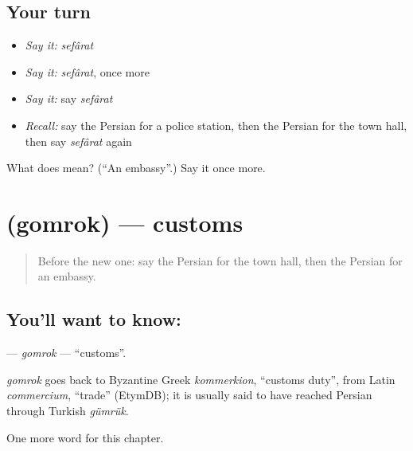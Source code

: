 \subsection*{Your turn}
\begin{itemize}
\raggedright
  \item \emph{Say it:} \emph{sefârat}
  \item \emph{Say it:} \emph{sefârat}, once more
  \item \emph{Say it:} say \emph{sefârat}
  \item \emph{Recall:} say the Persian for a police station, then the Persian for the town hall, then say \emph{sefârat} again
\end{itemize}

\begin{tcolorbox}[breakable,colback=teal!4,colframe=teal!35!black,title={Before you move on}]
What does  mean? (\textquotedblleft{}An embassy\textquotedblright{}.) Say it once more.
\end{tcolorbox}
\section[\texorpdfstring{\fa{گمرک} (gomrok)}{گمرک (gomrok)}]{ (gomrok) — customs}

\label{lesson:FA-C155-gomrok}



\begin{quote}
Before the new one: say the Persian for the town hall, then the Persian for an embassy.
\end{quote}

\subsection*{You'll want to know: }
\textbf{} — \emph{gomrok} — \textquotedblleft{}customs\textquotedblright{}.

\begin{cousinweb}
\emph{gomrok} goes back to Byzantine Greek \emph{kommerkion}, \textquotedblleft{}customs duty\textquotedblright{}, from Latin \emph{commercium}, \textquotedblleft{}trade\textquotedblright{} (EtymDB); it is usually said to have reached Persian through Turkish \emph{gümrük}.
\end{cousinweb}

\begin{grammarlens}[title={What you've built}]
One more word for this chapter.
\end{grammarlens}

